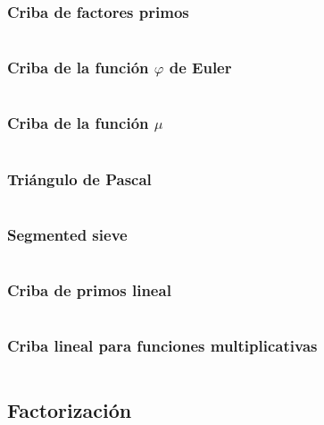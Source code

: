 \documentclass[11pt]{article}
\begin{document}
			\subsubsection{Criba de factores primos}
			\inputminted[tabsize=2,breaklines,firstline=162,lastline=170,fontsize=\small]{c++}{numberTheory.cpp}
			
			\subsubsection{Criba de la función $\varphi$ de Euler}
			\inputminted[tabsize=2,breaklines,firstline=172,lastline=180,fontsize=\small]{c++}{numberTheory.cpp}
			
			\subsubsection{Criba de la función $\mu$}
			\inputminted[tabsize=2,breaklines,firstline=801,lastline=809,fontsize=\small]{c++}{numberTheory.cpp}
			
			\subsubsection{Triángulo de Pascal}
			\inputminted[tabsize=2,breaklines,firstline=182,lastline=192,fontsize=\small]{c++}{numberTheory.cpp}
			
			\subsubsection{Segmented sieve}
			\inputminted[tabsize=2,breaklines,firstline=860,lastline=892,fontsize=\small]{c++}{numberTheory.cpp}
			
			\subsubsection{Criba de primos lineal}
			\inputminted[tabsize=2,breaklines,firstline=811,lastline=825,fontsize=\small]{c++}{numberTheory.cpp}
			
			\subsubsection{Criba lineal para funciones multiplicativas}
			\inputminted[tabsize=2,breaklines,firstline=827,lastline=858,fontsize=\small]{c++}{numberTheory.cpp}
			
		
		\subsection{Factorización}
\end{document}
